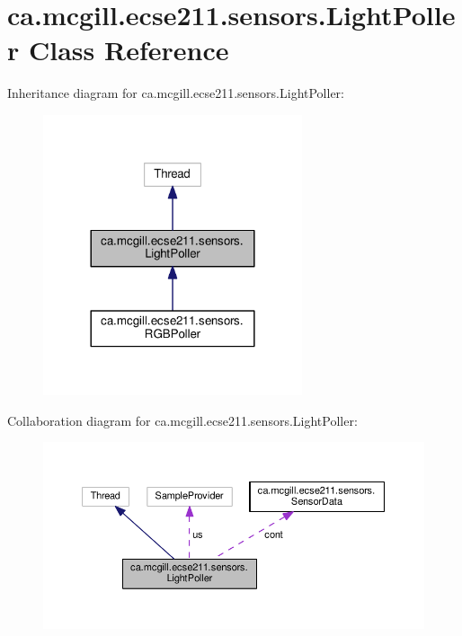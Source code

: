 \hypertarget{classca_1_1mcgill_1_1ecse211_1_1sensors_1_1_light_poller}{}\section{ca.\+mcgill.\+ecse211.\+sensors.\+Light\+Poller Class Reference}
\label{classca_1_1mcgill_1_1ecse211_1_1sensors_1_1_light_poller}


Inheritance diagram for ca.\+mcgill.\+ecse211.\+sensors.\+Light\+Poller\+:
\nopagebreak
\begin{figure}[H]
\begin{center}
\leavevmode
\includegraphics[width=216pt]{classca_1_1mcgill_1_1ecse211_1_1sensors_1_1_light_poller__inherit__graph}
\end{center}
\end{figure}


Collaboration diagram for ca.\+mcgill.\+ecse211.\+sensors.\+Light\+Poller\+:
\nopagebreak
\begin{figure}[H]
\begin{center}
\leavevmode
\includegraphics[width=350pt]{classca_1_1mcgill_1_1ecse211_1_1sensors_1_1_light_poller__coll__graph}
\end{center}
\end{figure}
